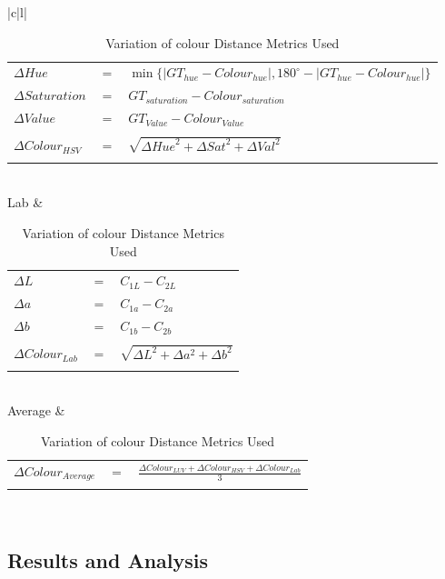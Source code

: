 \begin{table}[!ht]
\begin{tabular}{|c|l|}
\begin{tabular}{lcl}
$\Delta{Hue}$ & $=$ & $\min\{ \mid GT_{hue} - Colour_{hue} \mid,  180^{\circ} - \mid GT_{hue} - Colour_{hue} \mid  \}$ \\
$\Delta  Saturation$ & $=$ & $GT_{saturation} - Colour_{saturation}$ \\
$\Delta  Value$ &  $=$ & $GT_{Value} - Colour_{Value}$ \\
\\
$\Delta Colour_{HSV}$ & $=$ & $\sqrt{\Delta{Hue}^{2} + \Delta{Sat}^{2}  + \Delta{Val}^{2} }$
\\
\hspace{4em}& & \\
\end{tabular}\\
\hline
Lab &
\begin{tabular}{lcl}
\\
$\Delta L$ & $=$ & $C_{1L} - C_{2L}$\\
$\Delta a$ & $=$ & $C_{1a} - C_{2a}$\\
$\Delta b$ & $=$ & $C_{1b} - C_{2b}$\\
\\
$\Delta{Colour_{Lab}}$ & $=$ & $\sqrt{\Delta{L}^{2} + \Delta{a}^{2}  + \Delta{b}^{2} }$
\\
\hspace{5em}& & \\
\end{tabular}\\
\hline
Average &
\begin{tabular}{lcl}
\\
$\Delta{Colour_{Average}}$ & $=$ & $\frac{\Delta{Colour_{LUV}} + \Delta{Colour_{HSV}} + \Delta{Colour_{Lab}}}{3}$
\\
\hspace{4em}& & \\
\end{tabular}\\
\hline
\end{tabular}
\caption{Variation of colour Distance Metrics Used}
\label{table:ColorVariation}
\end{table}


\subsection{Results and Analysis}

